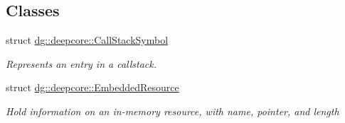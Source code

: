 \subsection*{Classes}
\begin{DoxyCompactItemize}
\item 
struct \hyperlink{structdg_1_1deepcore_1_1_call_stack_symbol}{dg\+::deepcore\+::\+Call\+Stack\+Symbol}
\begin{DoxyCompactList}\small\item\em Represents an entry in a callstack. \end{DoxyCompactList}\item 
struct \hyperlink{structdg_1_1deepcore_1_1_embedded_resource}{dg\+::deepcore\+::\+Embedded\+Resource}
\begin{DoxyCompactList}\small\item\em Hold information on an in-\/memory resource, with name, pointer, and length


\end{DoxyCompactList}
\end{DoxyCompactItemize}
